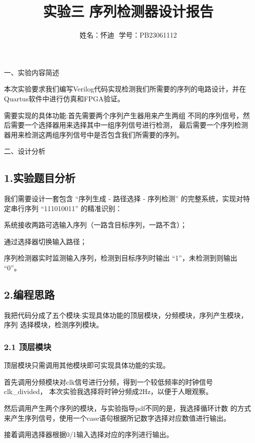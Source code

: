 \documentclass[12pt]{article}
\title{实验三\,\,序列检测器设计报告}
\author{姓名：怀迪\,\, 学号：PB23061112 \\ }
\date{}
\begin{document}
\maketitle

\begin{highlightedsection}{}
    一、实验内容简述
\end{highlightedsection}
本次实验要求我们编写Verilog代码实现检测我们所需要的序列的电路设计，并在
Quartus软件中进行仿真和FPGA验证。

需要实现的具体功能:首先需要两个序列产生器用来产生两组
不同的序列信号，然后需要一个选择器用来选择其中一组序列信号进行检测，
最后需要一个序列检测器用来检测这两组序列信号中是否包含我们所需要的序列。



\begin{highlightedsection}{}
    二、设计分析
\end{highlightedsection}
\subsection*{1.实验题目分析}
我们需要设计一套包含 “序列生成 - 路径选择 - 序列检测” 的完整系统，实现对特定串行序列 “111010011” 的精准识别：

系统接收两路可选输入序列（一路含目标序列，一路不含）；

通过选择器切换输入路径；

序列检测器实时监测输入序列，检测到目标序列时输出 “1”，未检测到则输出 “0”。

\subsection*{2.编程思路}
我把代码分成了五个模块:实现具体功能的顶层模块，分频模块，序列产生模块，序列
选择模块，检测序列模块。
\subsubsection*{2.1 顶层模块}
顶层模块只需调用其他模块即可实现具体功能的实现。

首先调用分频模块对clk信号进行分频，得到一个较低频率的时钟信号clk\_divided，
本次实验我选择将时钟分频成2Hz，以便于人眼观察。

然后调用产生两个序列的模块，与实验指导pdf不同的是，我选择循环计数
的方式来产生序列信号，使用一个case语句根据所记数字选择对应数值进行输出。

接着调用选择器根据0/1输入选择对应的序列进行输出。
\end{document}
